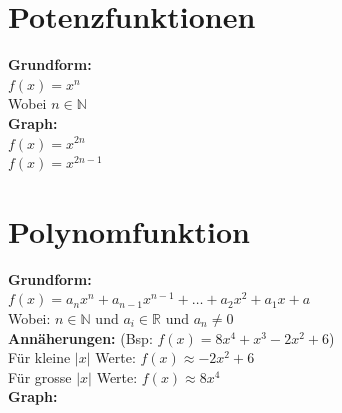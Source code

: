 \documentclass[11pt,twocolumn,a4paper]{article}
\title{\titleText}
\author{\authorText}
\date{\dateText}
\newcommand*{\field}[1]{\mathbb{#1}}%
\begin{document}
\section{Potenzfunktionen}
\textbf{Grundform:}\\
\(f(x) = x^n\)\\Wobei \(n \in \field{N}\)\\
\textbf{Graph:}\\
\(f(x) = x^{2n}\)\\
\(f(x) = x^{2n-1}\)
\section{Polynomfunktion}
\textbf{Grundform:}\\
\(f(x) = a_nx^n + a_{n-1}x^{n-1} + \dots + a_2x^2 + a_1x + a \)\\
Wobei: \(n \in \field{N}\) und \(a_i \in \field{R}\) und \(a_n \ne 0\)\\
\textbf{Annäherungen:} (Bsp: \(f(x)=8x^4+x^3-2x^2+6\))\\
Für kleine \(|x|\) Werte: \(f(x) \approx -2x^2 + 6\)\\
Für grosse \(|x|\) Werte: \(f(x) \approx 8x^4\)\\
\textbf{Graph:}\\
\end{document}
